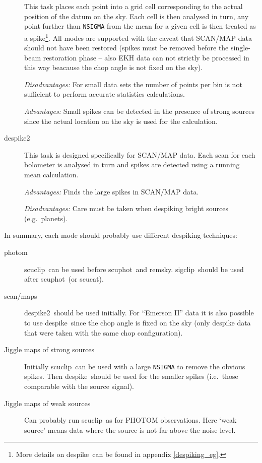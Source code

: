 \documentclass[twoside,11pt]{article}
\newcommand{\task}[1]{{\sf #1}}
\newcommand{\param}[1]{{\tt #1}}
\newcommand{\scuphot}{\htmlref{\task{scuphot}}{SCUPHOT}}
\newcommand{\remsky}{\htmlref{\task{remsky}}{REMSKY}}
\newcommand{\scucat}{\htmlref{\task{scucat}}{SCUCAT}}
\newcommand{\sigclip}{\htmlref{\task{sigclip}}{SIGCLIP}}
\newcommand{\despike}{\htmlref{\task{despike}}{DESPIKE}}
\newcommand{\despikeb}{\htmlref{\task{despike2}}{DESPIKE2}}
\newcommand{\scuclip}{\htmlref{\task{scuclip}}{SCUCLIP}}
\newcommand{\htmlref}[2]{#1}
\renewcommand{\_}{\texttt{\symbol{95}}}
\begin{document}
\begin{description}
This task places each point into a grid cell corresponding to the actual
position of the datum on the sky. Each cell is then analysed in turn, any
point further than \param{NSIGMA} from the mean for a given cell is then
treated as a spike\footnote{More details on \despike\ can be found in appendix
\ref{despiking_eg}.}.  All modes are supported with the caveat that SCAN/MAP
data should not have been restored (spikes must be removed before the
single-beam restoration phase -- also EKH data can not strictly be processed
in this way beacause the chop angle is not fixed on the sky).

\textit{Disadvantages:} For small data sets the number of points per bin is
not sufficient to perform accurate statistics calculations.

\textit{Advantages:} Small spikes can be detected in the presence of strong
sources since the actual location on the sky is used for the calculation.

\item[\despikeb] \mbox{}

This task is designed specifically for SCAN/MAP data. Each scan for each
bolometer is analysed in turn and spikes are detected using a running mean
calculation. 

\textit{Advantages:}  Finds the large spikes in SCAN/MAP data.

\textit{Disadvantages:} Care must be taken when despiking bright sources
(e.g.\ planets).

\end{description}

In summary, each mode should probably use different despiking
techniques:

\begin{description}

\item[photom] \mbox{}

\scuclip\ can be used before \scuphot\ and \remsky. \sigclip\ should be used
after \scuphot\ (or \scucat).

\item[scan/maps] \mbox{}

\despikeb\ should be used initially. For ``Emerson II'' data it is also
possible to use \despike\ since the chop angle is fixed on the sky (only
despike data that were taken with the same chop configuration).

\item[Jiggle maps of strong sources] \mbox{}

Initially \scuclip\ can be used with a large \param{NSIGMA} to remove the
obvious spikes. Then \despike\ should be used for the smaller spikes (i.e.\
those comparable with the source signal).

\item[Jiggle maps of weak sources] \mbox{}

Can probably run \scuclip\ as for PHOTOM observations. Here `weak source'
means data where the source is not far above the noise level.

\end{description}
\end{document}
